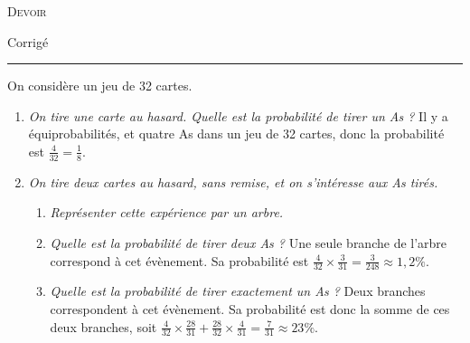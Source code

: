 \documentclass[12pt]{article}
\begin{document}
\begin{center}
\textsc{Devoir}

Corrigé
\end{center}
\hrule

\begin{exercice}
  On considère un jeu de 32 cartes.
  \begin{enumerate}
    \item \emph{On tire une carte au hasard. Quelle est la probabilité de tirer un As ?} Il y a équiprobabilités, et quatre As dans un jeu de 32 cartes, donc la probabilité est $\frac{4}{32}=\frac{1}{8}$.
    \item \emph{On tire deux cartes au hasard, sans remise, et on s'intéresse aux As tirés.}
    \begin{enumerate}
      \item \emph{Représenter cette expérience par un arbre.}
      \item \emph{Quelle est la probabilité de tirer deux As ?} Une seule branche de l'arbre correspond à cet évènement. Sa probabilité est
        $\frac{4}{32}\times\frac{3}{31}=\frac{3}{248}\approx1,2\%$.
      \item \emph{Quelle est la probabilité de tirer exactement un As ?} Deux branches correspondent à cet évènement. Sa probabilité est donc la somme de ces deux branches, soit
        $\frac{4}{32}\times\frac{28}{31}+
        \frac{28}{32}\times\frac{4}{31}=\frac{7}{31}\approx23\%$.
    \end{enumerate}
  \end{enumerate}
  \begin{center}
  \end{center}
\end{exercice}
\end{document}

